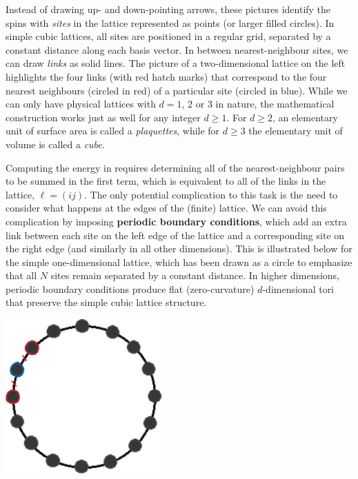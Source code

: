 Instead of drawing up- and down-pointing arrows, these pictures identify the spins with \textit{sites} in the lattice represented as points (or larger filled circles).
In simple cubic lattices, all sites are positioned in a regular grid, separated by a constant distance along each basis vector.
In between nearest-neighbour sites, we can draw \textit{links} as solid lines.
The picture of a two-dimensional lattice on the left highlights the four links (with red hatch marks) that correspond to the four nearest neighbours (circled in red) of a particular site (circled in blue).
While we can only have physical lattices with $d = 1$, $2$ or $3$ in nature, the mathematical construction works just as well for any integer $d \geq 1$.
For $d \geq 2$, an elementary unit of surface area is called a \textit{plaquettes}, while for $d \geq 3$ the elementary unit of volume is called a \textit{cube}.

Computing the energy in  requires determining all of the nearest-neighbour pairs to be summed in the first term, which is equivalent to all of the links in the lattice, $\ell = (ij)$.
The only potential complication to this task is the need to consider what happens at the edges of the (finite) lattice.
We can avoid this complication by imposing \textbf{periodic boundary conditions}, which add an extra link between each site on the left edge of the lattice and a corresponding site on the right edge (and similarly in all other dimensions).
This is illustrated below for the simple one-dimensional lattice, which has been drawn as a circle to emphasize that all $N$ sites remain separated by a constant distance.
In higher dimensions, periodic boundary conditions produce flat (zero-curvature) $d$-dimensional tori that preserve the simple cubic lattice structure.

\begin{center}\includegraphics[width=0.45\textwidth]{figs/unit09_lattice_1d.pdf}\end{center}

